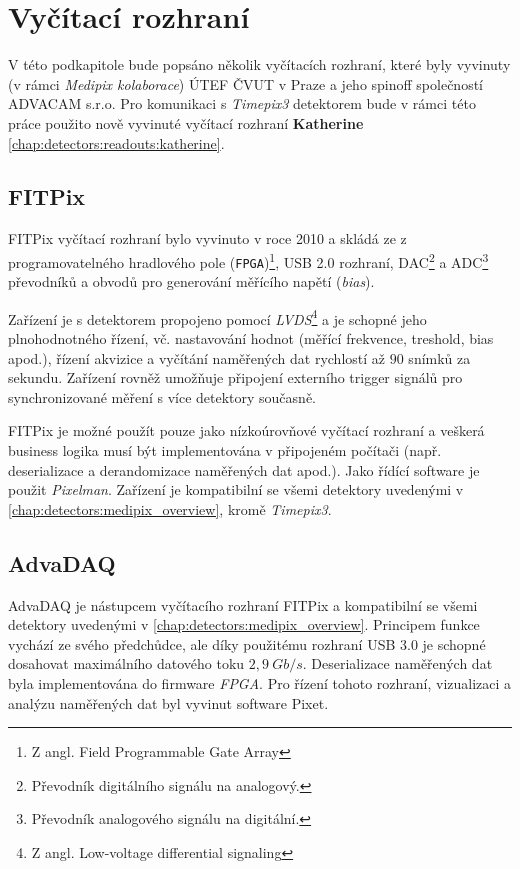 \section{Vyčítací rozhraní}\label{chap:detectors:readouts}
V této podkapitole bude popsáno několik vyčítacích rozhraní, které byly vyvinuty (v rámci \textit{Medipix kolaborace}) ÚTEF ČVUT v Praze a jeho spinoff společností ADVACAM s.r.o. Pro komunikaci s \textit{Timepix3} detektorem bude v rámci této práce použito nově vyvinuté vyčítací rozhraní \textbf{Katherine} \cite{Katherine} \ref{chap:detectors:readouts:katherine}.

\subsection{FITPix}
FITPix \cite{fitpix} vyčítací rozhraní bylo vyvinuto v roce 2010 a skládá ze z programovatelného hradlového pole (\texttt{FPGA})\footnote{Z angl. Field Programmable Gate Array}, USB 2.0 rozhraní, DAC\footnote{Převodník digitálního signálu na analogový.} a ADC\footnote{Převodník analogového signálu na digitální.} převodníků a obvodů pro generování měřícího napětí (\textit{bias}).

Zařízení je s detektorem propojeno pomocí \textit{LVDS}\footnote{Z angl. Low-voltage differential signaling} a je schopné jeho plnohodnotného řízení, vč. nastavování hodnot (měřící frekvence, treshold, bias apod.), řízení akvizice a vyčítání naměřených dat rychlostí až $90$ snímků za sekundu. Zařízení rovněž umožňuje připojení externího trigger signálů pro synchronizované měření s více detektory současně.

FITPix je možné použít pouze jako nízkoúrovňové vyčítací rozhraní a veškerá business logika musí být implementována v připojeném počítači (např. deserializace a derandomizace naměřených dat apod.). Jako řídící software je použit \textit{Pixelman}\cite{pixelman}. Zařízení je kompatibilní se všemi detektory uvedenými v \ref{chap:detectors:medipix_overview}, kromě \textit{Timepix3}.

\subsection{AdvaDAQ}
AdvaDAQ \cite{Turecek2016TimeWakl} je nástupcem vyčítacího rozhraní FITPix a kompatibilní se všemi detektory uvedenými v \ref{chap:detectors:medipix_overview}. Principem funkce vychází ze svého předchůdce, ale díky použitému rozhraní USB 3.0 je schopné dosahovat maximálního datového toku $2,9~Gb/s$. Deserializace naměřených dat byla implementována do firmware \textit{FPGA}. Pro řízení tohoto rozhraní, vizualizaci a analýzu naměřených dat byl vyvinut software Pixet.

